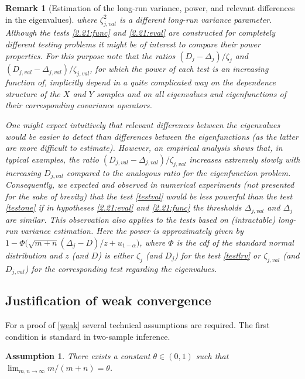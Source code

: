 \documentclass[11pt]{article}
\newtheorem{rem}{Remark}[section]
\newtheorem{assumption}{Assumption}[section]
\numberwithin{equation}{section}
\numberwithin{theorem}{section}
\numberwithin{lemma}{section}
\numberwithin{proposition}{section}
\numberwithin{cor}{section}
\numberwithin{definition}{section}
\numberwithin{cons}{section}
\numberwithin{rem}{section}
\numberwithin{exa}{section}
\numberwithin{table}{section}
\numberwithin{figure}{section}
\numberwithin{algo}{section}
\begin{document}
{{\begin{rem}[Estimation of the long-run variance, power, and  relevant differences in the eigenvalues]
{where  $\zeta_{j,val}^{2}$  is  a different  long-run variance parameter.
Although the   tests \eqref{2.21:func}  and \eqref{2.21:eval}   are constructed for completely different testing problems it might be of interest to compare their  power properties. For this purpose note that the ratios $(D_j-\Delta_j)/\zeta_j$ and $(D_{j,val}-\Delta_{j,val})/\zeta_{j,val}$, for which the power of each test is an increasing function of, implicitly depend in a quite complicated way on the dependence structure of the $X$ and $Y$ samples and on all eigenvalues  and eigenfunctions of their  corresponding  covariance operators.

One might expect intuitively that relevant differences between the eigenvalues would be easier to detect than differences between the eigenfunctions (as the latter are more difficult to estimate). However, an empirical analysis shows that, in typical examples,  the  ratio $(D_{j,val}-\Delta_{j,val})/\zeta_{j,val}$ increases extremely slowly with increasing $D_{j,val}$ compared to the analogous ratio for the eigenfunction problem. Consequently,  we expected and observed in numerical experiments (not presented for the sake of brevity) that  the test  \eqref{testval}  would be   less powerful than the   test  \eqref{testone}
 if  in hypotheses  \eqref{2.21:eval}  and \eqref{2.21:func}   the  thresholds $\Delta_{j,val}$ and $\Delta_{j} $ are similar. This observation also applies to the tests based on (intractable) long-run variance estimation. Here the power is approximately given by
$ 1 - \Phi \big (  \sqrt{m+n} (\Delta_{j} -D ) / z + u_{1-\alpha} \big )  $, where $\Phi$ is the cdf of the standard normal distribution
and $z$  (and $D$) is either $\zeta_j$ (and $D_{j} $) for the test \eqref{testlrv}  or $ \zeta_{j,val}$ (and $D_{j,val}$) for the corresponding test regarding the eigenvalues.
}
\end{rem}

\subsection{Justification of  weak convergence}
\label{sec22}

For a proof of  \eqref{weak} several technical assumptions are required. The first condition is standard in two-sample inference.

\begin{assumption}\label{theta}
There exists a constant  $\theta \in (0,1)$ such that $\lim_{m,n \to \infty} {m}/({m+n}) = \theta$.
\end{assumption}

}}
\end{document}
